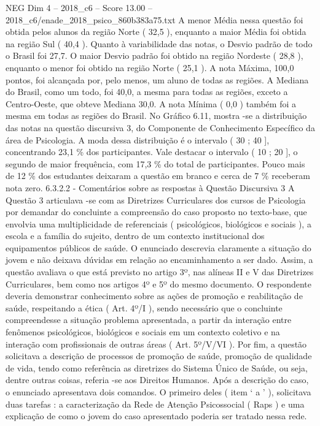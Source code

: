 \begin{textsample}{NEG Dim 4 – 2018\_c6 – Score 13.00 – 2018\_c6/enade\_2018\_psico\_860b383a75.txt}
A menor Média nessa questão foi obtida pelos alunos da região Norte ( 32,5 ), enquanto a maior Média foi obtida na região Sul ( 40,4 ).
Quanto à variabilidade das notas, o Desvio padrão de todo o Brasil foi 27,7.
O maior Desvio padrão foi obtido na região Nordeste ( 28,8 ), enquanto o menor foi obtido na região Norte ( 25,1 ).
A nota Máxima, 100,0 pontos, foi alcançada por, pelo menos, um aluno de todas as regiões.
A Mediana do Brasil, como um todo, foi 40,0, a mesma para todas as regiões, exceto a Centro-Oeste, que obteve Mediana 30,0.
A nota Mínima ( 0,0 ) também foi a mesma em todas as regiões do Brasil.
No Gráfico 6.11, mostra -se a distribuição das notas na questão discursiva 3, do Componente de Conhecimento Específico da área de Psicologia.
A moda dessa distribuição é o intervalo ( 30 ; 40 ], concentrando 23,1 \% dos participantes.
Vale destacar o intervalo ( 10 ; 20 ], o segundo de maior frequência, com 17,3 \% do total de participantes.
Pouco mais de 12 \% dos estudantes deixaram a questão em branco e cerca de 7 \% receberam nota zero. 6.3.2.2 - Comentários sobre as respostas à Questão Discursiva 3 A Questão 3 articulava -se com as Diretrizes Curriculares dos cursos de Psicologia por demandar do concluinte a compreensão do caso proposto no texto-base, que envolvia uma multiplicidade de referenciais ( psicológicos, biológicos e sociais ), a escola e a família do sujeito, dentro de um contexto institucional dos equipamentos públicos de saúde.
O enunciado descrevia claramente a situação do jovem e não deixava dúvidas em relação ao encaminhamento a ser dado.
Assim, a questão avaliava o que está previsto no artigo 3º, nas alíneas II e V das Diretrizes Curriculares, bem como nos artigos 4º e 5º do mesmo documento.
O respondente deveria demonstrar conhecimento sobre as ações de promoção e reabilitação de saúde, respeitando a ética ( Art. 4º/I ), sendo necessário que o concluinte compreendesse a situação problema apresentada, a partir da interação entre fenômenos psicológicos, biológicos e sociais em um contexto coletivo e na interação com profissionais de outras áreas ( Art. 5º/V/VI ).
Por fim, a questão solicitava a descrição de processos de promoção de saúde, promoção de qualidade de vida, tendo como referência as diretrizes do Sistema Único de Saúde, ou seja, dentre outras coisas, referia -se aos Direitos Humanos.
Após a descrição do caso, o enunciado apresentava dois comandos.
O primeiro deles ( item ‘ a ’ ), solicitava duas tarefas : a caracterização da Rede de Atenção Psicossocial ( Raps ) e uma explicação de como o jovem do caso apresentado poderia ser tratado nessa rede.

\end{textsample}
